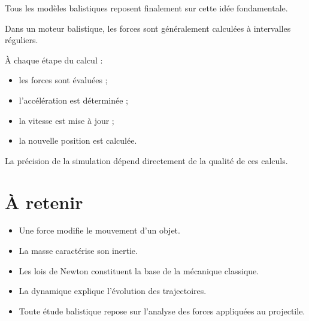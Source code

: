 Tous les modèles balistiques reposent finalement sur cette idée fondamentale.

\begin{simulation}

Dans un moteur balistique, les forces sont généralement calculées à intervalles
réguliers.

À chaque étape du calcul :

\begin{itemize}
\item les forces sont évaluées ;
\item l'accélération est déterminée ;
\item la vitesse est mise à jour ;
\item la nouvelle position est calculée.
\end{itemize}

La précision de la simulation dépend directement de la qualité de ces calculs.

\end{simulation}

\section{À retenir}

\begin{aretenir}

\begin{itemize}
\item Une force modifie le mouvement d'un objet.
\item La masse caractérise son inertie.
\item Les lois de Newton constituent la base de la mécanique classique.
\item La dynamique explique l'évolution des trajectoires.
\item Toute étude balistique repose sur l'analyse des forces appliquées au projectile.
\end{itemize}

\end{aretenir}

